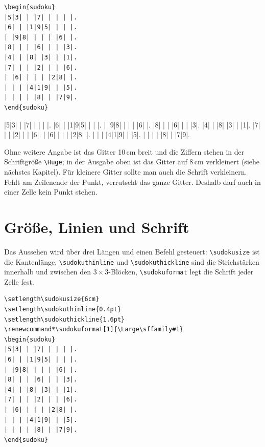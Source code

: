 \begin{lstlisting}[style=latex]
\begin{sudoku}
|5|3| | |7| | | | |.
|6| | |1|9|5| | | |.
| |9|8| | | | |6| |.
|8| | | |6| | | |3|.
|4| | |8| |3| | |1|.
|7| | | |2| | | |6|.
| |6| | | | |2|8| |.
| | | |4|1|9| | |5|.
| | | | |8| | |7|9|.
\end{sudoku}
\end{lstlisting}

\begin{ausgabe}
\setlength\sudokusize{8cm}
\begin{sudoku}
|5|3| | |7| | | | |.
|6| | |1|9|5| | | |.
| |9|8| | | | |6| |.
|8| | | |6| | | |3|.
|4| | |8| |3| | |1|.
|7| | | |2| | | |6|.
| |6| | | | |2|8| |.
| | | |4|1|9| | |5|.
| | | | |8| | |7|9|.
\end{sudoku}
\end{ausgabe}

Ohne weitere Angabe ist das Gitter 10\,cm breit und die Ziffern stehen in der Schriftgröße \texttt{\textbackslash Huge}; in der Ausgabe oben ist das Gitter auf 8\,cm verkleinert (siehe nächstes Kapitel). Für kleinere Gitter sollte man auch die Schrift verkleinern. Fehlt am Zeilenende der Punkt, verrutscht das ganze Gitter. Deshalb darf auch in einer Zelle kein Punkt stehen.



\section{Größe, Linien und Schrift}

Das Aussehen wird über drei Längen und einen Befehl gesteuert: \texttt{\textbackslash sudokusize} ist die Kantenlänge, \texttt{\textbackslash sudokuthinline} und \texttt{\textbackslash sudokuthickline} sind die Strichstärken innerhalb und zwischen den $3\times3$-Blöcken, \texttt{\textbackslash sudokuformat} legt die Schrift jeder Zelle fest.

\begin{lstlisting}[style=latex]
\setlength\sudokusize{6cm}
\setlength\sudokuthinline{0.4pt}
\setlength\sudokuthickline{1.6pt}
\renewcommand*\sudokuformat[1]{\Large\sffamily#1}
\begin{sudoku}
|5|3| | |7| | | | |.
|6| | |1|9|5| | | |.
| |9|8| | | | |6| |.
|8| | | |6| | | |3|.
|4| | |8| |3| | |1|.
|7| | | |2| | | |6|.
| |6| | | | |2|8| |.
| | | |4|1|9| | |5|.
| | | | |8| | |7|9|.
\end{sudoku}
\end{lstlisting}

